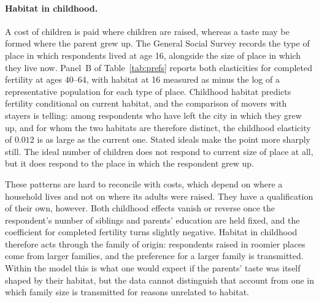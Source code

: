 \documentclass[11pt]{article}
\begin{document}
\paragraph{Habitat in childhood.}
A cost of children is paid where children are raised, whereas a taste may be formed where the
parent grew up. The General Social Survey records the type of place in which respondents lived at
age 16, alongside the size of place in which they live now. Panel~B of Table~\ref{tab:prefs}
reports both elasticities for completed fertility at ages 40--64, with habitat at 16 measured as
minus the log of a representative population for each type of place. Childhood habitat predicts
fertility conditional on current habitat, and the comparison of movers with stayers is telling:
among respondents who have left the city in which they grew up, and for whom the two habitats are
therefore distinct, the childhood elasticity of $0.012$ is as large as the current one. Stated
ideals make the point more sharply still. The ideal number of children does not respond to current
size of place at all, but it does respond to the place in which the respondent grew up.

These patterns are hard to reconcile with costs, which depend on where a household lives and not
on where its adults were raised. They have a qualification of their own, however. Both childhood
effects vanish or reverse once the respondent's number of siblings and parents' education are held
fixed, and the coefficient for completed fertility turns slightly negative. Habitat in childhood therefore acts through the family of origin: respondents raised in
roomier places come from larger families, and the preference for a larger family is transmitted.
Within the model this is what one would expect if the parents' taste was itself shaped by their
habitat, but the data cannot distinguish that account from one in which family size is
transmitted for reasons unrelated to habitat.
\end{document}
